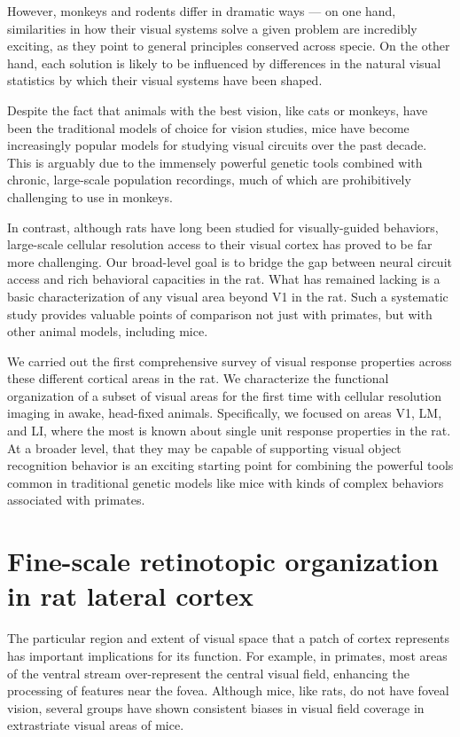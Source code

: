 However, monkeys and rodents differ in dramatic ways --- on one hand, similarities in how their visual systems solve a given problem are incredibly exciting, as they point to general principles conserved across specie. On the other hand, each solution is likely to be influenced by differences in the natural visual statistics by which their visual systems have been shaped. 

Despite the fact that animals with the best vision, like cats or monkeys, have been the traditional models of choice for vision studies, mice have become increasingly popular models for studying visual circuits over the past decade. This is arguably due to the immensely powerful genetic tools combined with chronic, large-scale population recordings, much of which are prohibitively challenging to use in monkeys.

In contrast, although rats have long been studied for visually-guided behaviors, large-scale cellular resolution access to their visual cortex has proved to be far more challenging. Our broad-level goal is to bridge the gap between neural circuit access and rich behavioral capacities in the rat. What has remained lacking is a basic characterization of any visual area beyond V1 in the rat. Such a systematic study provides valuable points of comparison not just with primates, but with other animal models, including mice. 

We carried out the first comprehensive survey of visual response properties across these different cortical areas in the rat. We characterize the functional organization of a subset of visual areas for the first time with cellular resolution imaging in awake, head-fixed animals. Specifically, we focused on areas V1, LM, and LI, where the most is known about single unit response properties in the rat. At a broader level, that they may be capable of supporting visual object recognition behavior is an exciting starting point for combining the powerful tools common in traditional genetic models like mice with kinds of complex behaviors associated with primates.  

\section{Fine-scale retinotopic organization in rat lateral cortex}
The particular region and extent of visual space that a patch of cortex represents has important implications for its function. For example, in primates, most areas of the ventral stream over-represent the central visual field, enhancing the processing of features near the fovea\cite{REFREF, Gattass2005CorticalDynamics}. Although mice, like rats, do not have foveal vision, several groups have shown consistent biases in visual field coverage in extrastriate visual areas of mice\cite{Garrett2014, Marshel2011, REFREF}. 

